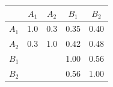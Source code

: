 \documentclass[nohyper,justified,marginals=raggedright]{tufte-book}\usepackage[]{graphicx}\usepackage[]{color}
\begin{document}
\begin{center}
\begin{tabular}{lrrrr}
\hline
\multicolumn{1}{l}{\bfseries }&\multicolumn{1}{c}{\bfseries $A_1$}&\multicolumn{1}{c}{\bfseries $A_2$}&\multicolumn{1}{c}{\bfseries $B_1$}&\multicolumn{1}{c}{\bfseries $B_2$}\tabularnewline
\hline
\bfseries   $A_1$&\cellcolor{firebrick}   1.0&\cellcolor{firebrick}   0.3&\cellcolor{xPurple}   0.35&\cellcolor{xPurple}   0.40\tabularnewline
\bfseries   $A_2$&\cellcolor{firebrick}   0.3&\cellcolor{firebrick}   1.0&\cellcolor{xPurple}   0.42&\cellcolor{xPurple}   0.48\tabularnewline
\bfseries   $B_1$&   &   &\cellcolor{royalblue}   1.00&\cellcolor{royalblue}   0.56\tabularnewline
\bfseries   $B_2$&   &   &\cellcolor{royalblue}   0.56&\cellcolor{royalblue}   1.00\tabularnewline
\hline
\end{tabular}\end{center}
\end{document}

